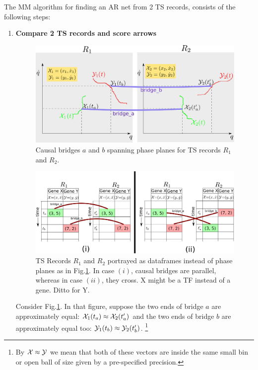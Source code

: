 \documentclass[12pt]{article}
\begin{document}
The MM algorithm 
for finding an AR net
from 2 TS records, consists of the following steps:
\begin{enumerate}
\item {\bf Compare 2 TS records
and score arrows}

\begin{figure}[h!]
\centering
\includegraphics[width=5in]
{two-phase-plane-bridges.png}
\caption{Causal bridges $a$ and $b$ spanning
	phase planes for
TS records $R_1$ and $R_2$.}
\label{fig-two-phase-plane-bridges}
\end{figure}
\begin{figure}[h!]
\centering
\includegraphics[width=6in]
{two-dataframes.png}
\caption{TS Records $R_1$ and $R_2$ portrayed
as dataframes instead of phase planes
as in Fig.\ref{fig-two-phase-plane-bridges}.
In case  $(i)$, causal bridges are 
parallel, whereas in case $(ii)$, they 
cross. X might be a TF instead of a gene.
Ditto for Y.}
\label{fig-two-dataframes}
\end{figure}

Consider Fig.\ref{fig-two-phase-plane-bridges}.
In that figure, suppose the two ends of bridge $a$ are approximately equal: ${\cal X}_1(t_a)\approx {\cal X}_2(t_a')$ and
the two ends of bridge $b$ are approximately equal too:
${\cal Y}_1(t_b)\approx {\cal Y}_2(t_b')$. \footnote{By ${\cal X}\approx {\cal Y}$ we mean that both of these vectors are inside the same small bin or open ball
of size given by a pre-specified precision.}


\end{enumerate}
\end{document}
